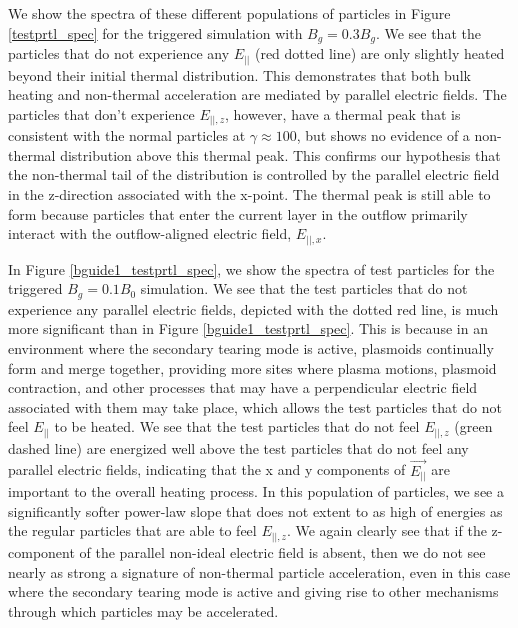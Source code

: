 \documentclass[iop,twocolappendix]{emulateapj}
\begin{document}
We show the spectra of these different populations of particles in Figure \ref{testprtl_spec} for the triggered simulation with $B_{g}=0.3B_{g}$.
We see that the particles that do not experience any $E_{||}$ (red dotted line) are only slightly heated beyond their initial thermal distribution.  This demonstrates that both bulk heating and non-thermal acceleration are mediated by parallel electric fields.  The particles that don't experience $E_{||,z}$, however, have a thermal peak that is consistent with the normal particles at $\gamma \approx 100$, but shows no evidence of a non-thermal distribution above this thermal peak.  This confirms our hypothesis that the non-thermal tail of the distribution is controlled by the parallel electric field in the z-direction associated with the x-point.  The thermal peak is still able to form because particles that enter the current layer in the outflow primarily interact with the outflow-aligned electric field, $E_{||,x}$.

In Figure \ref{bguide1_testprtl_spec}, we show the spectra of test particles for the triggered $B_{g} = 0.1 B_{0}$ simulation.  We see that the test particles that do not experience any parallel electric fields, depicted with the dotted red line, is much more significant than in Figure \ref{bguide1_testprtl_spec}.  This is because in an environment where the secondary tearing mode is active, plasmoids continually form and merge together, providing more sites where plasma motions, plasmoid contraction, and other processes that may have a perpendicular electric field associated with them may take place, which allows the test particles that do not feel $E_{||}$ to be heated.  We see that the test particles that do not feel $E_{||,z}$ (green dashed line) are energized well above the test particles that do not feel any parallel electric fields, indicating that the x and y components of $\vec{E_{||}}$ are important to the overall heating process.  In this population of particles, we see a significantly softer power-law slope that does not extent to as high of energies as the regular particles that are able to feel $E_{||,z}$.  We again clearly see that if the z-component of the parallel non-ideal electric field is absent, then we do not see nearly as strong a signature of non-thermal particle acceleration, even in this case where the secondary tearing mode is active and giving rise to other mechanisms through which particles may be accelerated.
	
\end{document}
